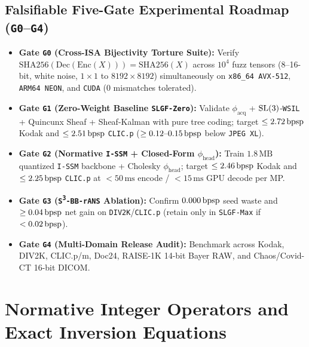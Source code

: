 \subsection{Falsifiable Five-Gate Experimental Roadmap (\texttt{G0}--\texttt{G4})}
\begin{itemize}
  \item \textbf{Gate \texttt{G0} (Cross-ISA Bijectivity Torture Suite):} Verify $\mathrm{SHA256}(\mathrm{Dec}(\mathrm{Enc}(X))) = \mathrm{SHA256}(X)$ across $10^4$ fuzz tensors (8--16-bit, white noise, $1\times 1$ to $8192\times 8192$) simultaneously on \texttt{x86\_64 AVX-512}, \texttt{ARM64 NEON}, and \texttt{CUDA} ($0$ mismatches tolerated).
  \item \textbf{Gate \texttt{G1} (Zero-Weight Baseline \texttt{SLGF-Zero}):} Validate $\phi_{\mathrm{acq}}$ + $\mathrm{SL}(3)$-\texttt{WSIL} + Quincunx Sheaf + Sheaf-Kalman with pure tree coding; target $\le 2.72\,\mathrm{bpsp}$ Kodak and $\le 2.51\,\mathrm{bpsp}$ \texttt{CLIC.p} ($\ge 0.12\text{--}0.15\,\mathrm{bpsp}$ below \texttt{JPEG~XL}).
  \item \textbf{Gate \texttt{G2} (Normative \texttt{I-SSM} + Closed-Form $\phi_{\mathrm{head}}$):} Train $1.8\,\mathrm{MB}$ quantized \texttt{I-SSM} backbone + Cholesky $\phi_{\mathrm{head}}$; target $\le 2.46\,\mathrm{bpsp}$ Kodak and $\le 2.25\,\mathrm{bpsp}$ \texttt{CLIC.p} at $<50\,\mathrm{ms}$ encode / $<15\,\mathrm{ms}$ GPU decode per MP.
  \item \textbf{Gate \texttt{G3} (\texttt{S\textsuperscript{3}-BB-rANS} Ablation):} Confirm $0.000\,\mathrm{bpsp}$ seed waste and $\ge 0.04\,\mathrm{bpsp}$ net gain on \texttt{DIV2K}/\texttt{CLIC.p} (retain only in \texttt{SLGF-Max} if $<0.02\,\mathrm{bpsp}$).
  \item \textbf{Gate \texttt{G4} (Multi-Domain Release Audit):} Benchmark across Kodak, DIV2K, CLIC.p/m, Doc24, RAISE-1K 14-bit Bayer RAW, and Chaos/Covid-CT 16-bit DICOM.
\end{itemize}

\appendix
\section{Normative Integer Operators and Exact Inversion Equations}
\label{sec:appendix-ops}

